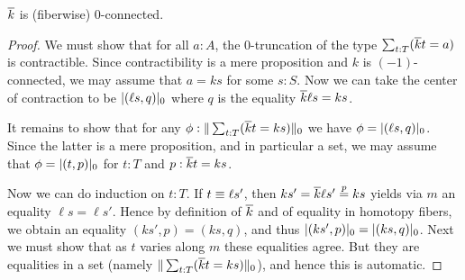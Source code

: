 \begin{lem}\label{thm:kbar}
  $\kbar$ is (fiberwise) 0-connected.
\end{lem}
\begin{proof}
  We must show that for all $a:A$, the 0-truncation of the type $\sum_{t:T}(\kbar t = a)$ is contractible.
  Since contractibility is a mere proposition and $k$ is $(-1)$-connected, we may assume that $a=ks$ for some $s:S$.
  Now we can take the center of contraction to be $\tproj0{(\ell s,q)}$ where $q$ is the equality $\kbar\ell s = k s$.

  It remains to show that for any $\phi:\trunc0{\sum_{t:T} (\kbar t = ks)}$ we have $\phi = \tproj0{(\ell s,q)}$.
  Since the latter is a mere proposition, and in particular a set, we may assume that $\phi=\tproj0{(t,p)}$ for $t:T$ and $p:\kbar t = ks$.

  Now we can do induction on $t:T$.
  If $t\jdeq\ell s'$, then $ks' = \kbar \ell s' \overset{p}{=} ks$ yields via $m$ an equality $\ell s = \ell s'$.
  Hence by definition of $\kbar$ and of equality in homotopy fibers, we obtain an equality $(ks',p) = (ks,q)$, and thus $\tproj0{(ks',p)} = \tproj0{(ks,q)}$.
  Next we must show that as $t$ varies along $m$ these equalities agree.
  But they are equalities in a set (namely $\trunc0{\sum_{t:T} (\kbar t = ks)}$), and hence this is automatic.
\end{proof}

